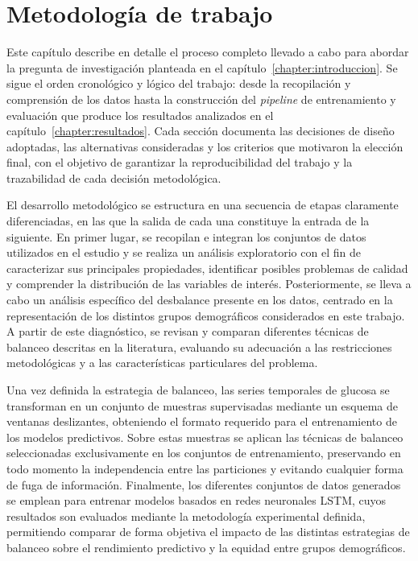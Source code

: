 \label{chapter:desarrollo}
\chapter{Metodología de trabajo}


Este capítulo describe en detalle el proceso completo llevado a cabo para abordar la pregunta de investigación planteada en el capítulo~\ref{chapter:introduccion}. Se sigue el orden cronológico y lógico del trabajo: desde la recopilación y comprensión de los datos hasta la construcción del \emph{pipeline} de entrenamiento y evaluación que produce los resultados analizados en el capítulo~\ref{chapter:resultados}. Cada sección documenta las decisiones de diseño adoptadas, las alternativas consideradas y los criterios que motivaron la elección final, con el objetivo de garantizar la reproducibilidad del trabajo y la trazabilidad de cada decisión metodológica.

El desarrollo metodológico se estructura en una secuencia de etapas claramente diferenciadas, en las que la salida de cada una constituye la entrada de la siguiente. En primer lugar, se recopilan e integran los conjuntos de datos utilizados en el estudio y se realiza un análisis exploratorio con el fin de caracterizar sus principales propiedades, identificar posibles problemas de calidad y comprender la distribución de las variables de interés. Posteriormente, se lleva a cabo un análisis específico del desbalance presente en los datos, centrado en la representación de los distintos grupos demográficos considerados en este trabajo. A partir de este diagnóstico, se revisan y comparan diferentes técnicas de balanceo descritas en la literatura, evaluando su adecuación a las restricciones metodológicas y a las características particulares del problema.

Una vez definida la estrategia de balanceo, las series temporales de glucosa se transforman en un conjunto de muestras supervisadas mediante un esquema de ventanas deslizantes, obteniendo el formato requerido para el entrenamiento de los modelos predictivos. Sobre estas muestras se aplican las técnicas de balanceo seleccionadas exclusivamente en los conjuntos de entrenamiento, preservando en todo momento la independencia entre las particiones y evitando cualquier forma de fuga de información. Finalmente, los diferentes conjuntos de datos generados se emplean para entrenar modelos basados en redes neuronales LSTM, cuyos resultados son evaluados mediante la metodología experimental definida, permitiendo comparar de forma objetiva el impacto de las distintas estrategias de balanceo sobre el rendimiento predictivo y la equidad entre grupos demográficos.


